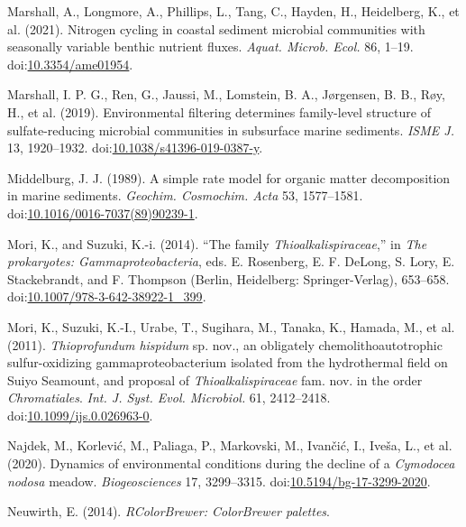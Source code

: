 \documentclass[12pt,]{article}
\begin{document}
\leavevmode\hypertarget{ref-Marshall2021}{}%
Marshall, A., Longmore, A., Phillips, L., Tang, C., Hayden, H.,
Heidelberg, K., et al. (2021). Nitrogen cycling in coastal sediment
microbial communities with seasonally variable benthic nutrient fluxes.
\emph{Aquat. Microb. Ecol.} 86, 1--19.
doi:\href{https://doi.org/10.3354/ame01954}{10.3354/ame01954}.

\leavevmode\hypertarget{ref-Marshall2019}{}%
Marshall, I. P. G., Ren, G., Jaussi, M., Lomstein, B. A., Jørgensen, B.
B., Røy, H., et al. (2019). Environmental filtering determines
family-level structure of sulfate-reducing microbial communities in
subsurface marine sediments. \emph{ISME J.} 13, 1920--1932.
doi:\href{https://doi.org/10.1038/s41396-019-0387-y}{10.1038/s41396-019-0387-y}.

\leavevmode\hypertarget{ref-Middelburg1989}{}%
Middelburg, J. J. (1989). A simple rate model for organic matter
decomposition in marine sediments. \emph{Geochim. Cosmochim. Acta} 53,
1577--1581.
doi:\href{https://doi.org/10.1016/0016-7037(89)90239-1}{10.1016/0016-7037(89)90239-1}.

\leavevmode\hypertarget{ref-Mori2014}{}%
Mori, K., and Suzuki, K.-i. (2014). ``The family
\emph{Thioalkalispiraceae},'' in \emph{The prokaryotes:
Gammaproteobacteria}, eds. E. Rosenberg, E. F. DeLong, S. Lory, E.
Stackebrandt, and F. Thompson (Berlin, Heidelberg: Springer-Verlag),
653--658.
doi:\href{https://doi.org/10.1007/978-3-642-38922-1_399}{10.1007/978-3-642-38922-1\_399}.

\leavevmode\hypertarget{ref-Mori2011}{}%
Mori, K., Suzuki, K.-I., Urabe, T., Sugihara, M., Tanaka, K., Hamada,
M., et al. (2011). \emph{Thioprofundum hispidum} sp. nov., an obligately
chemolithoautotrophic sulfur-oxidizing gammaproteobacterium isolated
from the hydrothermal field on Suiyo Seamount, and proposal of
\emph{Thioalkalispiraceae} fam. nov. in the order \emph{Chromatiales}.
\emph{Int. J. Syst. Evol. Microbiol.} 61, 2412--2418.
doi:\href{https://doi.org/10.1099/ijs.0.026963-0}{10.1099/ijs.0.026963-0}.

\leavevmode\hypertarget{ref-Najdek2020}{}%
Najdek, M., Korlević, M., Paliaga, P., Markovski, M., Ivančić, I.,
Iveša, L., et al. (2020). Dynamics of environmental conditions during
the decline of a \emph{Cymodocea} \emph{nodosa} meadow.
\emph{Biogeosciences} 17, 3299--3315.
doi:\href{https://doi.org/10.5194/bg-17-3299-2020}{10.5194/bg-17-3299-2020}.

\leavevmode\hypertarget{ref-Neuwirth2014}{}%
Neuwirth, E. (2014). \emph{RColorBrewer: ColorBrewer palettes}.
\end{document}
